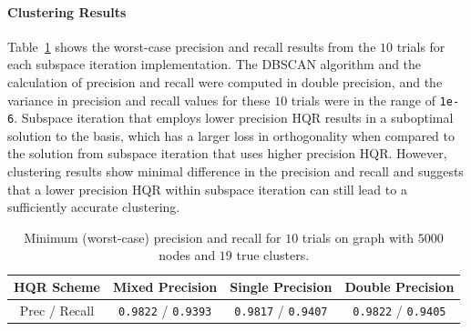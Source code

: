 \paragraph{Clustering Results} 
Table~\ref{table:PR} shows the worst-case precision and recall results from the $10$ trials for each subspace iteration implementation. 
The DBSCAN algorithm and the calculation of precision and recall were computed in double precision, and the variance in precision and recall values for these $10$ trials were in the range of {\tt 1e-6}.
Subspace iteration that employs lower precision HQR results in a suboptimal solution to the basis, which has a larger loss in orthogonality when compared to the solution from subspace iteration that uses higher precision HQR. 
However, clustering results show minimal difference in the precision and recall and suggests that a lower precision HQR within subspace iteration can still lead to a sufficiently accurate clustering. 
\begin{table}[h!]
	\centering
\begin{tabular}{ |c|c|c|c| }
\hline
HQR Scheme & Mixed Precision & Single Precision & Double Precision \\ \hline
Prec / Recall & 
{\tt 0.9822} / {\tt 0.9393} &
{\tt 0.9817} / {\tt 0.9407} &
{\tt 0.9822} / {\tt 0.9405} \\
\hline
\end{tabular}
	\caption{\label{table:PR} Minimum (worst-case) precision and recall for $10$ trials on graph with $5000$ nodes and $19$ true clusters.}
\end{table}
